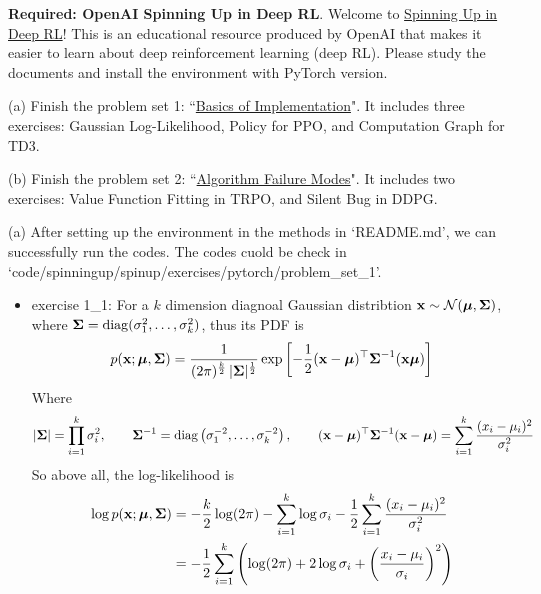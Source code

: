 \begin{homeworkProblem}

\textbf{Required: OpenAI Spinning Up in Deep RL}. Welcome to \href{https://spinningup.openai.com/en/latest/user/introduction.html}{Spinning Up in Deep RL}! This is an educational resource produced by OpenAI that makes it easier to learn about deep reinforcement learning (deep RL). Please study the documents and install the environment with PyTorch version.

(a) Finish the problem set 1: ``\href{https://spinningup.openai.com/en/latest/spinningup/exercises.html#problem-set-1-basics-of-implementation}{Basics of Implementation}". It includes three exercises: Gaussian Log-Likelihood, Policy for PPO, and Computation Graph for TD3.

(b) Finish the problem set 2: ``\href{https://spinningup.openai.com/en/latest/spinningup/exercises.html#problem-set-2-algorithm-failure-modes}{Algorithm Failure Modes}". It includes two exercises: Value Function Fitting in TRPO, and Silent Bug in DDPG.

\solution

(a) After setting up the environment in the methods in `README.md', we can successfully run the codes. The codes cuold be check in `code/spinningup/spinup/exercises/pytorch/problem\_set\_1'.

\begin{itemize}
    \item exercise 1\_1: For a $k$ dimension diagnoal Gaussian distribtion $\mathbf{x}\sim\mathcal{N}(\boldsymbol{\mu},\boldsymbol{\Sigma})$, where $\boldsymbol{\Sigma}=\operatorname{diag}(\sigma_1^2,\dots,\sigma_k^2)$, thus its PDF is
    $$p(\mathbf{x};\boldsymbol{\mu},\boldsymbol{\Sigma})=\dfrac{1}{(2\pi)^{\frac{k}{2}}\,|\boldsymbol{\Sigma}|^{\frac{1}{2}}}\exp\left[-\frac{1}{2}(\mathbf{x}-\boldsymbol{\mu})^{\top}\boldsymbol{\Sigma}^{-1}(\mathbf{x}\boldsymbol{\mu})\right]$$
    Where
    $$|\boldsymbol{\Sigma}|=\prod_{i=1}^{k}\sigma_i^{2}, \qquad \boldsymbol{\Sigma}^{-1}=\operatorname{diag}\left(\sigma_1^{-2},\dots,\sigma_k^{-2}\right), \qquad (\mathbf{x}-\boldsymbol{\mu})^{\top}\boldsymbol{\Sigma}^{-1}(\mathbf{x}-\boldsymbol{\mu})=\sum_{i=1}^{k}\frac{(x_i-\mu_i)^2}{\sigma_i^{2}}$$
    So above all, the log-likelihood is
    \begin{align*}
    \log p(\mathbf{x};\boldsymbol{\mu},\boldsymbol{\Sigma}) &= -\frac{k}{2}\log(2\pi)-\sum_{i=1}^{k}\log\sigma_i-\frac{1}{2}\sum_{i=1}^{k}\frac{(x_i-\mu_i)^2}{\sigma_i^{2}} \\
    &= -\dfrac{1}{2}\sum_{i=1}^k\left(\log(2\pi)+2\log\sigma_i+\left(\dfrac{x_i-\mu_i}{\sigma_i}\right)^2\right)
    \end{align*}


\end{itemize}
\end{homeworkProblem}
